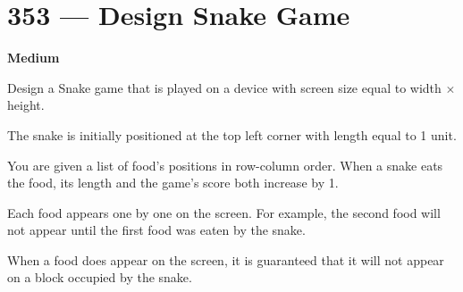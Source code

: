 \section{353 --- Design Snake Game}

\textbf{Medium}

Design a Snake game that is played on a device with screen size equal to width $\times$ height. 

The snake is initially positioned at the top left corner  with length equal to 1 unit.

You are given a list of food's positions in row-column order. When a snake eats the food, its length and the game's score both increase by 1.

Each food appears one by one on the screen. For example, the second food will not appear until the first food was eaten by the snake.

When a food does appear on the screen, it is guaranteed that it will not appear on a block occupied by the snake.

